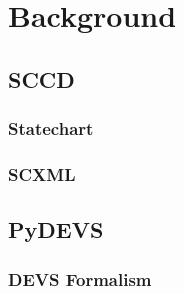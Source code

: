 \chapter{Background}
\label{chapt:Background}

\section{SCCD}
\subsection{Statechart}
\subsection{SCXML}

\section{PyDEVS}
\subsection{DEVS Formalism}